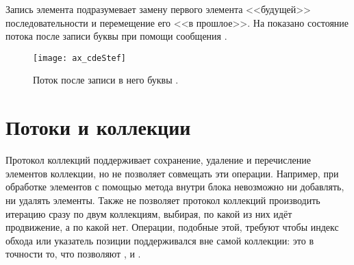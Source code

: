 \documentclass[a4paper,10pt,twoside]{book}
\begin{document}
Запись элемента подразумевает замену первого элемента <<будущей>> последовательности и перемещение его <<в прошлое>>. На  показано состояние потока после записи буквы  при помощи сообщения  .

\begin{figure}[h!t]
\centerline{\texttt{[image: ax\_cdeStef]}}
\caption{Поток после записи в него буквы .}
\vspace{.2in}
\end{figure}

\section{Потоки и коллекции}

Протокол коллекций поддерживает сохранение, удаление и перечисление элементов коллекции, но не позволяет совмещать эти операции. Например, при обработке элементов  с помощью метода  внутри блока  невозможно ни добавлять, ни удалять элементы.
Также не позволяет протокол коллекций производить итерацию сразу по двум коллекциям, выбирая, по какой из них идёт продвижение, а по какой нет. Операции, подобные этой, требуют чтобы индекс обхода или указатель позиции поддерживался вне самой коллекции: это в точности то, что позволяют ,  и .
\end{document}

